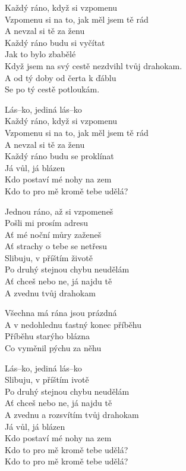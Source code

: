 
\ve{}
Každý ráno, když si vzpomenu\\
Vzpomenu si na to, jak měl jsem tě rád \\
A nevzal si tě za ženu\\
Každý ráno budu si vyčítat\\
Jak to bylo zbabělé\\
Když jsem na svý cestě nezdvihl tvůj drahokam.\\
A od tý doby od čerta k ďáblu\\
Se po tý cestě potloukám.

\cho{}
Lás--ko, jediná lás--ko\\
Každý ráno, když si vzpomenu\\
Vzpomenu si na to, jak měl jsem tě rád\\
A nevzal si tě za ženu\\
Každý ráno budu se proklínat\\
Já vůl, já blázen\\
Kdo postaví mé nohy na zem\\
Kdo to pro mě kromě tebe udělá?

\ve{}
Jednou ráno, až si vzpomeneš\\
Pošli mi prosím adresu\\
Ať mé noční můry zaženeš\\
Ať strachy o tebe se netřesu\\
Slibuju, v příštím životě\\
Po druhý stejnou chybu neudělám\\
Ať chceš nebo ne, já najdu tě\\
A zvednu tvůj drahokam

\cho{}

\ve{}
Všechna má rána jsou prázdná\\
A v nedohlednu ťastný konec příběhu\\
Příběhu starýho blázna\\
Co vyměnil pýchu za něhu

\cho{}
Lás--ko, jediná lás--ko\\
Slibuju, v příštím ivotě\\
Po druhý stejnou chybu neudělám\\
Ať chceš nebo ne, já najdu tě\\
A zvednu a rozsvítím tvůj drahokam\\
Já vůl, já blázen\\
Kdo postaví mé nohy na zem\\
Kdo to pro mě kromě tebe udělá?\\
Kdo to pro mě kromě tebe udělá?

\esong{}